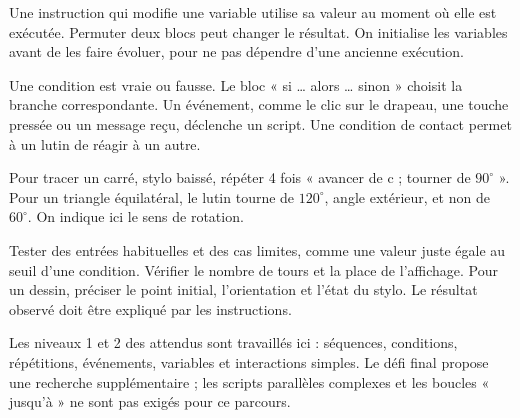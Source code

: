 \begin{attention}Une instruction qui modifie une variable utilise sa valeur au moment où elle est exécutée. Permuter deux blocs peut changer le résultat. On initialise les variables avant de les faire évoluer, pour ne pas dépendre d’une ancienne exécution.\end{attention}
\clearpage
{}\label{cours-18-2}
\begin{definition}Une condition est vraie ou fausse. Le bloc « si … alors … sinon » choisit la branche correspondante. Un événement, comme le clic sur le drapeau, une touche pressée ou un message reçu, déclenche un script. Une condition de contact permet à un lutin de réagir à un autre.\end{definition}
\begin{exemple}Pour tracer un carré, stylo baissé, répéter 4 fois « avancer de c ; tourner de $90^\circ$ ». Pour un triangle équilatéral, le lutin tourne de $120^\circ$, angle extérieur, et non de $60^\circ$. On indique ici le sens de rotation.\end{exemple}
\begin{savoirfaire}Tester des entrées habituelles et des cas limites, comme une valeur juste égale au seuil d’une condition. Vérifier le nombre de tours et la place de l’affichage. Pour un dessin, préciser le point initial, l’orientation et l’état du stylo. Le résultat observé doit être expliqué par les instructions.\end{savoirfaire}
\begin{attention}Les niveaux 1 et 2 des attendus sont travaillés ici : séquences, conditions, répétitions, événements, variables et interactions simples. Le défi final propose une recherche supplémentaire ; les scripts parallèles complexes et les boucles « jusqu’à » ne sont pas exigés pour ce parcours.\end{attention}

